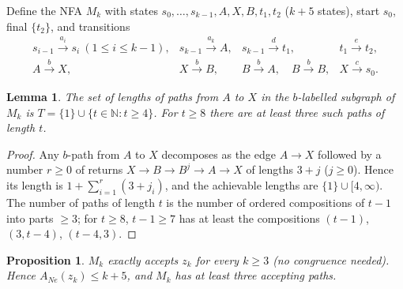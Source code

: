 \documentclass[11pt]{article}
\newtheorem{lemma}[theorem]{Lemma}
\newtheorem{proposition}[theorem]{Proposition}
\theoremstyle{definition}
\newcommand{\ANe}{A_{Ne}}
\newcommand{\N}{\mathbb{N}}
\begin{document}
Define the NFA $M_k$ with states
$s_0,\dots,s_{k-1},A,X,B,t_1,t_2$ ($k+5$ states), start $s_0$, final
$\{t_2\}$, and transitions
\[
\begin{array}{llll}
s_{i-1}\xrightarrow{\,a_i\,}s_i\ (1\le i\le k-1), &
s_{k-1}\xrightarrow{\,a_k\,}A, &
s_{k-1}\xrightarrow{\,d\,}t_1, &
t_1\xrightarrow{\,e\,}t_2,\\[2pt]
A\xrightarrow{\,b\,}X, &
X\xrightarrow{\,b\,}B, &
B\xrightarrow{\,b\,}A,\quad B\xrightarrow{\,b\,}B, &
X\xrightarrow{\,c\,}s_0 .
\end{array}
\]

\begin{lemma}\label{lem:gadgetT}
The set of lengths of paths from $A$ to $X$ in the $b$-labelled subgraph of
$M_k$ is $T=\{1\}\cup\{t\in\N: t\ge4\}$. For $t\ge 8$ there are at least
three such paths of length $t$.
\end{lemma}

\begin{proof}
Any $b$-path from $A$ to $X$ decomposes as the edge $A\to X$ followed by a
number $r\ge0$ of returns $X\to B\to B^{j}\to A\to X$ of lengths $3+j$
($j\ge0$). Hence its length is $1+\sum_{i=1}^r(3+j_i)$, and the achievable
lengths are $\{1\}\cup[4,\infty)$. The number of paths of length $t$ is the
number of ordered compositions of $t-1$ into parts $\ge3$; for $t\ge8$,
$t-1\ge7$ has at least the compositions $(t-1)$, $(3,t-4)$, $(t-4,3)$.
\end{proof}

\begin{proposition}\label{prop:upper-exact}
$M_k$ exactly accepts $z_k$ for every $k\ge3$ (no congruence needed). Hence
$\ANe(z_k)\le k+5$, and $M_k$ has at least three accepting paths.
\end{proposition}
\end{document}

